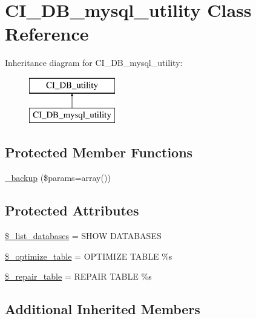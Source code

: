 \hypertarget{class_c_i___d_b__mysql__utility}{}\section{C\+I\+\_\+\+D\+B\+\_\+mysql\+\_\+utility Class Reference}
\label{class_c_i___d_b__mysql__utility}
Inheritance diagram for C\+I\+\_\+\+D\+B\+\_\+mysql\+\_\+utility\+:\begin{figure}[H]
\begin{center}
\leavevmode
\includegraphics[height=2.000000cm]{class_c_i___d_b__mysql__utility}
\end{center}
\end{figure}
\subsection*{Protected Member Functions}
\begin{DoxyCompactItemize}
\item 
\mbox{\hyperlink{class_c_i___d_b__mysql__utility_a30f3053d2c82e7562349924363507afa}{\+\_\+backup}} (\$params=array())
\end{DoxyCompactItemize}
\subsection*{Protected Attributes}
\begin{DoxyCompactItemize}
\item 
\mbox{\hyperlink{class_c_i___d_b__mysql__utility_afe3a5b80562d93d6bc7e2b53c95b7e5a}{\$\+\_\+list\+\_\+databases}} = \textquotesingle{}S\+H\+OW D\+A\+T\+A\+B\+A\+S\+ES\textquotesingle{}
\item 
\mbox{\hyperlink{class_c_i___d_b__mysql__utility_a083199e5c22c78912dae0a47bb2d7fad}{\$\+\_\+optimize\+\_\+table}} = \textquotesingle{}O\+P\+T\+I\+M\+I\+ZE T\+A\+B\+LE \%s\textquotesingle{}
\item 
\mbox{\hyperlink{class_c_i___d_b__mysql__utility_a5cf925cbd52e3f6ba5b7ada3fa436efc}{\$\+\_\+repair\+\_\+table}} = \textquotesingle{}R\+E\+P\+A\+IR T\+A\+B\+LE \%s\textquotesingle{}
\end{DoxyCompactItemize}
\subsection*{Additional Inherited Members}


